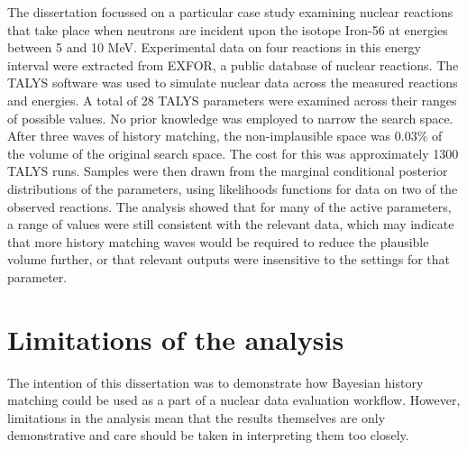 \documentclass[
  12pt,
  a4paper,
  twoside]{book}
\begin{document}
The dissertation focussed on a particular case study examining nuclear reactions that take place when neutrons are incident upon the isotope Iron-56 at energies between 5 and 10 MeV. Experimental data on four reactions in this energy interval were extracted from EXFOR, a public database of nuclear reactions. The TALYS software was used to simulate nuclear data across the measured reactions and energies. A total of 28 TALYS parameters were examined across their ranges of possible values. No prior knowledge was employed to narrow the search space. After three waves of history matching, the non-implausible space was 0.03\% of the volume of the original search space. The cost for this was approximately 1300 TALYS runs. Samples were then drawn from the marginal conditional posterior distributions of the parameters, using likelihoods functions for data on two of the observed reactions. The analysis showed that for many of the active parameters, a range of values were still consistent with the relevant data, which may indicate that more history matching waves would be required to reduce the plausible volume further, or that relevant outputs were insensitive to the settings for that parameter.

\hypertarget{limits}{%
\section{Limitations of the analysis}\label{limits}}

The intention of this dissertation was to demonstrate how Bayesian history matching could be used as a part of a nuclear data evaluation workflow. However, limitations in the analysis mean that the results themselves are only demonstrative and care should be taken in interpreting them too closely.
\end{document}
